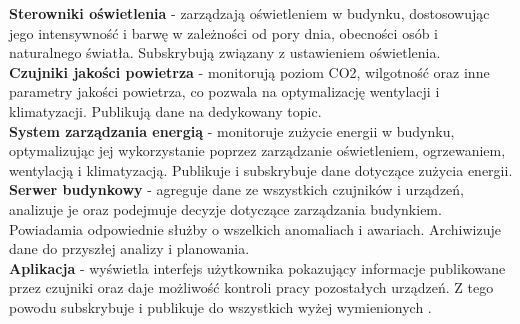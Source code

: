 \textbf{Sterowniki oświetlenia} - zarządzają oświetleniem w budynku, dostosowując jego intensywność i barwę w zależności od pory dnia, obecności osób i naturalnego światła. Subskrybują  związany z ustawieniem oświetlenia.\\

\textbf{Czujniki jakości powietrza} - monitorują poziom CO2, wilgotność oraz inne parametry jakości powietrza, co pozwala na optymalizację wentylacji i klimatyzacji. Publikują dane na dedykowany topic.\\

\textbf{System zarządzania energią} - monitoruje zużycie energii w budynku, optymalizując jej wykorzystanie poprzez zarządzanie oświetleniem, ogrzewaniem, wentylacją i klimatyzacją. Publikuje i subskrybuje dane dotyczące zużycia energii.\\

\textbf{Serwer budynkowy} - agreguje dane ze wszystkich czujników i urządzeń, analizuje je oraz podejmuje decyzje dotyczące zarządzania budynkiem. Powiadamia odpowiednie służby o wszelkich anomaliach i awariach. Archiwizuje dane do przyszłej analizy i planowania.\\

\textbf{Aplikacja} - wyświetla interfejs użytkownika pokazujący informacje publikowane przez czujniki oraz daje możliwość kontroli pracy pozostałych urządzeń. Z tego powodu subskrybuje i publikuje do wszystkich wyżej wymienionych .\\